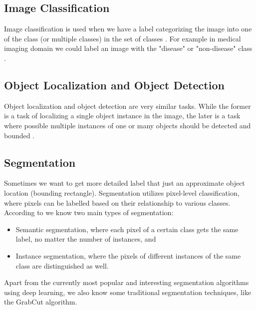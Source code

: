 \subsection{Image Classification}
Image classification is used when we have a label categorizing the image into one of the class (or multiple classes) in the set of classes \cite{Alam2021}. For example in medical imaging domain we could label an image with the "disease" or "non-disease" class .

\subsection{Object Localization and Object Detection}
Object localization and object detection are very similar tasks. While the former is a task of localizing a single object instance in the image, the later is a task where possible multiple instances of one or many objects should be detected and bounded \cite{Alam2021}.

\subsection{Segmentation} Sometimes we want to get more detailed label that just an approximate object location (bounding rectangle). Segmentation utilizes pixel-level classification, where pixels can be labelled based on their relationship to various classes. According to \cite{Alam2021} we know two main types of segmentation:

\begin{itemize}
    \item Semantic segmentation, where each pixel of a certain class gets the same label, no matter the number of instances, and
    \item Instance segmentation, where the pixels of different instances of the same class are distinguished as well.
\end{itemize}

Apart from the currently most popular and interesting segmentation algorithms using deep learning, we also know some traditional segmentation techniques, like the GrabCut algorithm.

